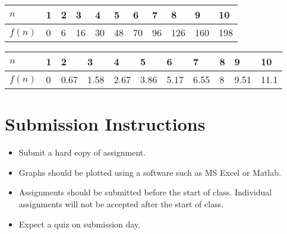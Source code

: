 \documentclass[12pt,a4paper]{article}
\begin{document}
\begin{table}[H]
\begin{center}
	{\footnotesize \begin{tabular}{|C{1.8cm}|C{0.75cm}|C{0.75cm}|C{0.75cm}|C{0.75cm}|C{0.75cm}|C{0.75cm}|C{0.75cm}|C{0.75cm}|C{0.75cm}|C{0.75cm}|}
	\hline
		\rule{0pt}{2.5ex}$n$& 1 & 2 & 3 & 4 & 5 & 6 & 7 & 8 & 9 & 10 \\
		\hline
		\rule{0pt}{2.5ex}$f(n)$& 0 & 6 & 16 & 30 & 48 & 70 & 96 & 126 & 160 & 198 \\
	\hline
	\end{tabular}}
\end{center}
\begin{center}
	{\footnotesize \begin{tabular}{|C{1.8cm}|C{0.75cm}|C{0.75cm}|C{0.75cm}|C{0.75cm}|C{0.75cm}|C{0.75cm}|C{0.75cm}|C{0.75cm}|C{0.75cm}|C{0.75cm}|}
	\hline
		\rule{0pt}{2.5ex}$n$& 1 & 2 & 3 & 4 & 5 & 6 & 7 & 8 & 9 & 10 \\
		\hline
		\rule{0pt}{2.5ex}$f(n)$& 0 & 0.67 & 1.58 & 2.67 & 3.86 & 5.17 & 6.55 & 8 & 9.51 & 11.1 \\
	\hline
	\end{tabular}}
\end{center}
\end{table}
\section{Submission Instructions}
\begin{itemize}
\item Submit a hard copy of assignment.
\item Graphs should be plotted using a software such as MS Excel or Matlab.
\item Assignments should be submitted before the start of class. Individual assignments will not be accepted after the start of class.
\item Expect a quiz on submission day.
\end{itemize}
\end{document}

